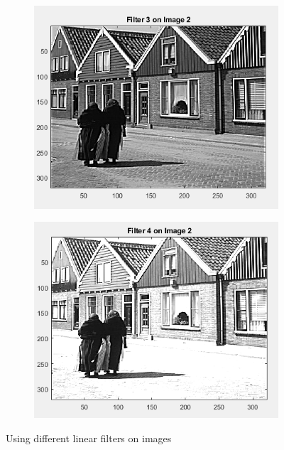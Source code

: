 \begin{figure}[h]
\begin{subfigure}{0.4\textwidth}
        \includegraphics[width=\textwidth]{Resources/F10-c.png}
        \caption{}
        \label{fig:first}
    \end{subfigure}
    \hfill
    \begin{subfigure}{0.4\textwidth}
        \includegraphics[width=\textwidth]{Resources/F10-d.png}
        \caption{}
        \label{fig:Second}
    \end{subfigure}
    \caption{Using different linear filters on images}
    \label{fig:ApplyingFilters}
\end{figure}
